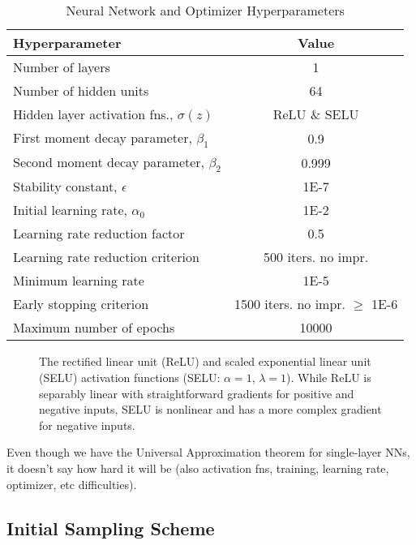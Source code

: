 \documentclass[conference]{IEEEtran}
\begin{document}
	\begin{table}[htbp]
    \renewcommand{\arraystretch}{1.0}
    \centering
    \caption{Neural Network and Optimizer Hyperparameters}
    \label{tab:nn_hyperparams}
        \begin{tabular}{lc}
        \toprule 
        \bfseries Hyperparameter & \bfseries Value \\ \midrule
	    Number of layers & 1 \\
	    Number of hidden units & 64 \\ 
	    Hidden layer activation fns., $\sigma(z)$ & ReLU \& SELU \\
	    First moment decay parameter, $\beta_1$ & 0.9 \\
	    Second moment decay parameter, $\beta_2$ & 0.999 \\
	    Stability constant, $\epsilon$ & 1E-7 \\ 
	    Initial learning rate, $\alpha_0$ & 1E-2 \\ 
	    Learning rate reduction factor & 0.5 \\
	    Learning rate reduction criterion & 500 iters. no impr. \\
	    Minimum learning rate & 1E-5 \\
	    Early stopping criterion & 1500 iters. no impr. $\ge$ 1E-6 \\ 
	    Maximum number of epochs & 10000 \\ \bottomrule
	    \end{tabular}
	\end{table}
	
	\begin{figure}[htbp]
	    \centering
	    \vspace*{-1em}
	    
	    \vspace*{-2em}
	    \caption{The rectified linear unit (ReLU) and scaled exponential linear unit (SELU) activation functions (SELU: $\alpha = 1$, $\lambda =1$). While ReLU is separably linear with straightforward gradients for positive and negative inputs, SELU is nonlinear and has a more complex gradient for negative inputs.}
	    \label{fig:activ_fns}
	\end{figure}
	
	Even though we have the Universal Approximation theorem for single-layer NNs, it doesn't say how hard it will be (also activation fns, training, learning rate, optimizer, etc difficulties). 
	
	\subsection{Initial Sampling Scheme}
	
\end{document}
